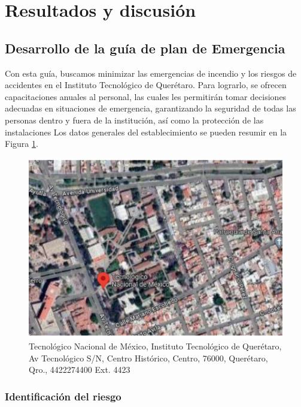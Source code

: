     \section{Resultados y discusión}
    
    \subsection{Desarrollo de la guía de plan de Emergencia}
    
    Con esta guía, buscamos minimizar las emergencias de incendio y los riesgos de accidentes en el Instituto Tecnológico de Querétaro. Para lograrlo, se ofrecen capacitaciones anuales al personal, las cuales les permitirán tomar decisiones adecuadas en situaciones de emergencia, garantizando la seguridad de todas las personas dentro y fuera de la institución, así como la protección de las instalaciones
    Los datos generales del establecimiento se pueden resumir en la Figura \ref{fig:mapa-itq}.
    \begin{figure}[H]
        \centering
        \includegraphics[scale=0.23]{30/img/Fotoescuela.pdf}
        \caption{Tecnológico Nacional de México, Instituto Tecnológico de Querétaro, Av Tecnológico S/N, Centro Histórico, Centro, 76000, Querétaro, Qro., 4422274400 Ext. 4423}
        \label{fig:mapa-itq}
    \end{figure}
    \subsubsection{Identificación del riesgo}
    
